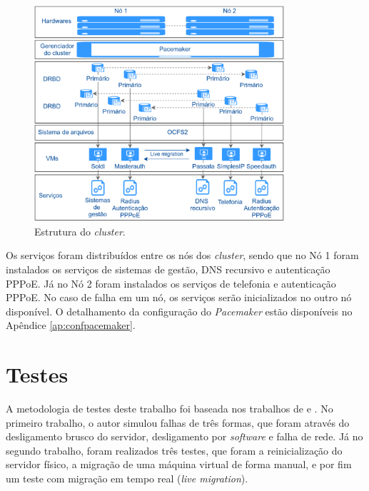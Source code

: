 \begin{figure}[h!]
 \centering
 \includegraphics[width=350px]{img/projeto_estrutura.eps}
 \caption{Estrutura do \textit{cluster}.}
 \label{fig:projeto_estrutura}
\end{figure}


Os serviços foram distribuídos entre os nós dos \textit{cluster}, sendo que no Nó 1 foram instalados os serviços de sistemas de gestão, 
\ac{DNS} recursivo e autenticação \ac{PPPoE}. Já no Nó 2 foram instalados os serviços de telefonia e autenticação \ac{PPPoE}.
No caso de falha em um nó, os serviços serão inicializados no outro nó disponível. O detalhamento da configuração do \textit{Pacemaker} 
estão disponíveis no Apêndice \ref{ap:confpacemaker}.


\section{Testes}

A metodologia de testes deste trabalho foi baseada nos trabalhos de \citet{reis2009} e \citet{goncalves2009}. No primeiro trabalho, 
o autor simulou falhas de três formas, que foram através do desligamento brusco do servidor, desligamento por \textit{software} e falha de rede. 
Já no segundo trabalho, foram realizados três testes, que foram a reinicialização do servidor físico, a migração de uma máquina virtual de forma
manual, e por fim um teste com migração em tempo real (\textit{live migration}).


